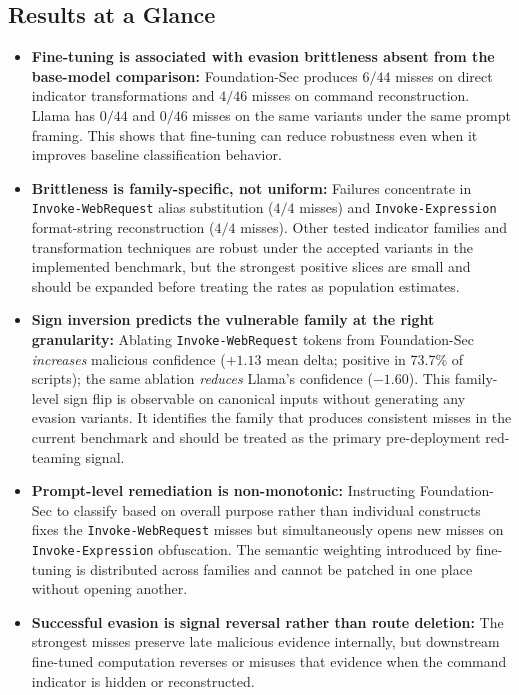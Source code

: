 \documentclass{article}
\begin{document}
\subsection{Results at a Glance}
\begin{itemize}[leftmargin=1.5em,itemsep=0.2em,topsep=0pt,parsep=0pt,partopsep=0pt]
  \item \textbf{Fine-tuning is associated with evasion brittleness absent from the base-model comparison:} Foundation-Sec produces \(6/44\) misses on direct indicator transformations and \(4/46\) misses on command reconstruction. Llama has \(0/44\) and \(0/46\) misses on the same variants under the same prompt framing. This shows that fine-tuning can reduce robustness even when it improves baseline classification behavior.
  \item \textbf{Brittleness is family-specific, not uniform:} Failures concentrate in \texttt{Invoke-WebRequest} alias substitution (\(4/4\) misses) and \texttt{Invoke-Expression} format-string reconstruction (\(4/4\) misses). Other tested indicator families and transformation techniques are robust under the accepted variants in the implemented benchmark, but the strongest positive slices are small and should be expanded before treating the rates as population estimates.
  \item \textbf{Sign inversion predicts the vulnerable family at the right granularity:} Ablating \texttt{Invoke-WebRequest} tokens from Foundation-Sec \emph{increases} malicious confidence (\(+1.13\) mean delta; positive in 73.7\% of scripts); the same ablation \emph{reduces} Llama's confidence (\(-1.60\)). This family-level sign flip is observable on canonical inputs without generating any evasion variants. It identifies the family that produces consistent misses in the current benchmark and should be treated as the primary pre-deployment red-teaming signal.
  \item \textbf{Prompt-level remediation is non-monotonic:} Instructing Foundation-Sec to classify based on overall purpose rather than individual constructs fixes the \texttt{Invoke-WebRequest} misses but simultaneously opens new misses on \texttt{Invoke-Expression} obfuscation. The semantic weighting introduced by fine-tuning is distributed across families and cannot be patched in one place without opening another.
  \item \textbf{Successful evasion is signal reversal rather than route deletion:} The strongest misses preserve late malicious evidence internally, but downstream fine-tuned computation reverses or misuses that evidence when the command indicator is hidden or reconstructed.

\end{itemize}
\end{document}
